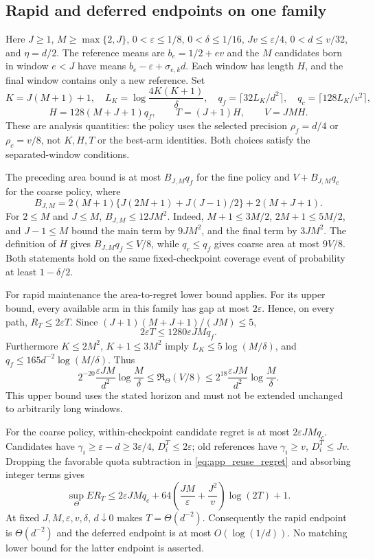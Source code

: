\documentclass[11pt]{article}
\theoremstyle{remark}
\begin{document}
\subsection{Rapid and deferred endpoints on one family}
\label{app:tradeoff}

Here $J\ge1$, $M\ge\max\{2,J\}$,
$0<\varepsilon\le1/8$, $0<\delta\le1/16$, $Jv\le\varepsilon/4$,
$0<d\le v/32$, and $\eta=d/2$. The reference means are
$b_e=1/2+ev$ and the $M$ candidates born in window $e<J$ have means
$b_e-\varepsilon+\sigma_{e,k}d$. Each window has length $H$, and the final
window contains only a new reference. Set
\[
 K=J(M+1)+1,\quad L_K=\log\frac{4K(K+1)}\delta,
 \quad q_f=\lceil32L_K/d^2\rceil,\quad q_c=\lceil128L_K/v^2\rceil,
\]
\[
 H=128(M+J+1)q_f,\qquad T=(J+1)H,\qquad V=JMH.
\]
These are analysis quantities: the policy uses the selected precision
$\rho_f=d/4$ or $\rho_c=v/8$, not $K,H,T$ or the best-arm identities.
Both choices satisfy the separated-window conditions.

The preceding area bound is at most $B_{J,M}q_f$ for the fine policy and
$V+B_{J,M}q_c$ for the coarse policy, where
\[
 B_{J,M}=2(M+1)\{J(2M+1)+J(J-1)/2\}+2(M+J+1).
\]
For $2\le M$ and $J\le M$, $B_{J,M}\le12JM^2$. Indeed,
$M+1\le3M/2$, $2M+1\le5M/2$, and $J-1\le M$ bound the main term by
$9JM^2$, and the final term by $3JM^2$. The definition of $H$ gives
$B_{J,M}q_f\le V/8$, while $q_c\le q_f$ gives coarse area at most $9V/8$.
Both statements hold on the same fixed-checkpoint coverage event of
probability at least $1-\delta/2$.

For rapid maintenance the area-to-regret lower bound applies. For its upper
bound, every available arm in this family has gap at most $2\varepsilon$.
Hence, on every path, $R_T\le2\varepsilon T$. Since
$(J+1)(M+J+1)/(JM)\le5$,
\[
 2\varepsilon T\le1280\varepsilon JM q_f.
\]
Furthermore $K\le2M^2$, $K+1\le3M^2$ imply
$L_K\le5\log(M/\delta)$, and
$q_f\le165d^{-2}\log(M/\delta)$. Thus
\[
 2^{-20}\frac{\varepsilon JM}{d^2}\log\frac M\delta
 \le\mathfrak R_\Theta(V/8)
 \le2^{18}\frac{\varepsilon JM}{d^2}\log\frac M\delta.
\]
This upper bound uses the stated horizon and must not be extended unchanged
to arbitrarily long windows.

For the coarse policy, within-checkpoint candidate regret is at most
$2\varepsilon JM q_c$. Candidates have
$\gamma_i\ge\varepsilon-d\ge3\varepsilon/4$, $D_i^T\le2\varepsilon$;
old references have $\gamma_i\ge v$, $D_i^T\le Jv$. Dropping the favorable
quota subtraction in \eqref{eq:app_reuse_regret} and absorbing integer terms
gives
\[
 \sup_\Theta ER_T\le2\varepsilon JM q_c+
 64\left(\frac{JM}{\varepsilon}+\frac{J^2}{v}\right)\log(2T)+1.
\]
At fixed $J,M,\varepsilon,v,\delta$, $d\downarrow0$ makes
$T=\Theta(d^{-2})$. Consequently the rapid endpoint is $\Theta(d^{-2})$
and the deferred endpoint is at most $O(\log(1/d))$. No matching lower bound
for the latter endpoint is asserted.
\end{document}
